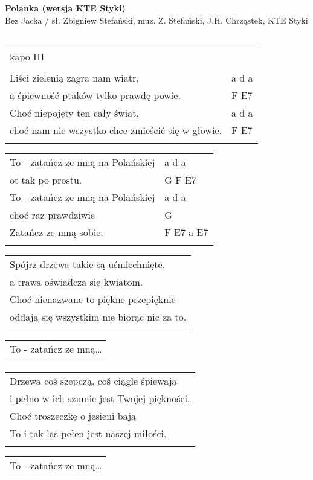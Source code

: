 \documentclass[a5paper]{article}
\begin{document}


\noindent
\fontsize{12pt}{15pt}\selectfont
\textbf{Polanka (wersja KTE Styki)} \\
\fontsize{8pt}{10pt}\selectfont
Bez Jacka / sł. Zbigniew Stefański, muz. Z. Stefański, J.H. Chrząstek, KTE Styki \\ \\
\fontsize{10pt}{12pt}\selectfont
{}
\begin{tabular}{@{}p{8.50cm}p{3cm}@{}}
\noindent
kapo III \\ \\
Liści zielenią zagra nam wiatr, & a d a \\
a śpiewność ptaków tylko prawdę powie. & F E7 \\
Choć niepojęty ten cały świat, & a d a \\
choć nam nie wszystko chce zmieścić się w głowie. & F E7 \\ \\
\end{tabular}

\noindent
\begin{tabular}{@{}p{7.50cm}p{3cm}@{}}
To - zatańcz ze mną na Polańskiej & a d a \\
ot tak po prostu. & G F E7 \\
To - zatańcz ze mną na Polańskiej & a d a \\
choć raz prawdziwie & G \\
Zatańcz ze mną sobie. & F E7 a E7 \\ \\
\end{tabular}

\noindent
\begin{tabular}{@{}p{8.50cm}@{}}
Spójrz drzewa takie są uśmiechnięte, \\
a trawa oświadcza się kwiatom. \\
Choć nienazwane to piękne przepięknie \\
oddają się wszystkim nie biorąc nic za to. \\ \\
\end{tabular}

\noindent
\begin{tabular}{@{}p{7.50cm}@{}}
To - zatańcz ze mną… \\ \\
\end{tabular}

\noindent
\begin{tabular}{@{}p{8.50cm}@{}}
Drzewa coś szepczą, coś ciągle śpiewają \\
i pełno w ich szumie jest Twojej piękności. \\
Choć troszeczkę o jesieni bają \\
To i tak las pełen jest naszej miłości. \\ \\
\end{tabular}

\noindent
\begin{tabular}{@{}p{7.50cm}@{}}
To - zatańcz ze mną…
\end{tabular}
\end{document}
